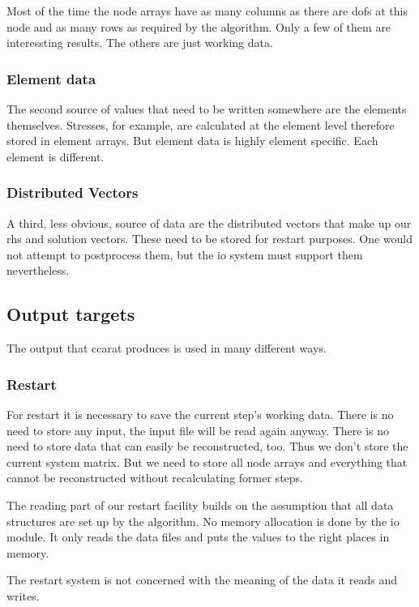 Most of the time the node arrays have as many columns as there are
dofs at this node and as many rows as required by the algorithm. Only
a few of them are interessting results. The others are just working
data.


\subsubsection{Element data}

The second source of values that need to be written somewhere are
the elements themselves. Stresses, for example, are calculated at
the element level therefore stored in element arrays. But element
data is highly element specific. Each element is different.


\subsubsection{Distributed Vectors}

A third, less obvious, source of data are the distributed vectors
that make up our rhs and solution vectors. These need to be stored
for restart purposes. One would not attempt to postprocess them, but
the io system must support them nevertheless.


\subsection{Output targets}

The output that ccarat produces is used in many different ways.


\subsubsection{Restart}

For restart it is necessary to save the current step's working data.
There is no need to store any input, the input file will be read again
anyway. There is no need to store data that can easily be reconstructed,
too. Thus we don't store the current system matrix. But we need to
store all node arrays and everything that cannot be reconstructed
without recalculating former steps.

The reading part of our restart facility builds on the assumption
that all data structures are set up by the algorithm. No memory allocation
is done by the io module. It only reads the data files and puts the
values to the right places in memory.

The restart system is not concerned with the meaning of the data it
reads and writes.


